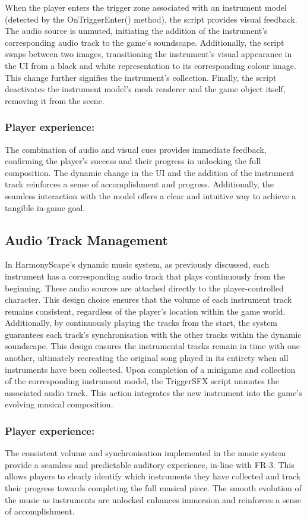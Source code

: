 \documentclass{l4proj}
\begin{document}
When the player enters the trigger zone associated with an instrument model (detected by the OnTriggerEnter() method), the script provides visual feedback. The audio source is unmuted, initiating the addition of the instrument's corresponding audio track to the game's soundscape. Additionally, the script swaps between two images, transitioning the instrument's visual appearance in the UI from a black and white representation to its corresponding colour image. This change further signifies the instrument's collection. Finally, the script deactivates the instrument model's mesh renderer and the game object itself, removing it from the scene.
    
\subsubsection{Player experience:}
The combination of audio and visual cues provides immediate feedback, confirming the player's success and their progress in unlocking the full composition. The dynamic change in the UI and the addition of the instrument track reinforces a sense of accomplishment and progress. Additionally, the seamless interaction with the model offers a clear and intuitive way to achieve a tangible in-game goal.

\subsection{Audio Track Management}
In HarmonyScape's dynamic music system, as previously discussed, each instrument has a corresponding audio track that plays continuously from the beginning. These audio sources are attached directly to the player-controlled character. This design choice ensures that the volume of each instrument track remains consistent, regardless of the player's location within the game world.  Additionally, by continuously playing the tracks from the start, the system guarantees each track's synchronisation with the other tracks within the dynamic soundscape. This design ensures the instrumental tracks remain in time with one another, ultimately recreating the original song played in its entirety when all instruments have been collected. Upon completion of a minigame and collection of the corresponding instrument model, the TriggerSFX script unmutes the associated audio track. This action integrates the new instrument into the game's evolving musical composition.

\subsubsection{Player experience:}
The consistent volume and synchronisation implemented in the music system provide a seamless and predictable auditory experience, in-line with FR-3. This allows players to clearly identify which instruments they have collected and track their progress towards completing the full musical piece. The smooth evolution of the music as instruments are unlocked enhances immersion and reinforces a sense of accomplishment.
\end{document}
